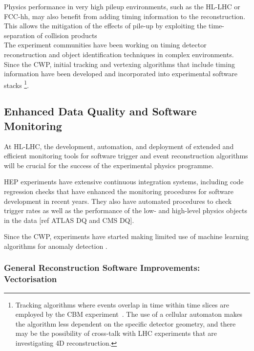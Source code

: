 Physics performance in very high pileup environments, such as the HL-LHC
or FCC-hh, may also benefit from adding timing information to the
reconstruction. This allows the mitigation of the effects of pile-up by
exploiting the time-separation of collision products~\cite{Collaboration:2623663,CMS:2667167}\\
The experiment communities have been working on timing detector
reconstruction and object identification techniques in complex
environments. Since the CWP, initial tracking and vertexing algorithms
that include timing information have been developed and incorporated
into experimental software stacks \cite{LindseyGreyMIPCTD}\footnote{Tracking algorithms where events overlap in time
within time slices are employed by the CBM experiment~\cite{Akishina:2015ghv,AkishinaThesis}. The use of a cellular automaton makes the
  algorithm less dependent on the specific detector geometry, and there
  may be the possibility of cross-talk with LHC experiments that are
  investigating 4D reconstruction.}.

\hypertarget{enhanced-data-quality-and-software-monitoring-for-trigger-and-reconstruction}{%
\subsection{Enhanced Data Quality and Software Monitoring}\label{enhanced-data-quality-and-software-monitoring-for-trigger-and-reconstruction}}

At HL-LHC, the development, automation, and deployment of extended and
efficient monitoring tools for software trigger and event reconstruction
algorithms will be crucial for the success of the experimental physics
programme.

HEP experiments have extensive continuous integration systems, including
code regression checks that have enhanced the monitoring procedures for
software development in recent years. They also have automated
procedures to check trigger rates as well as the performance of the low-
and high-level physics objects in the data {[}ref ATLAS DQ and CMS
DQ{]}.

Since the CWP, experiments have started making limited use of machine
learning algorithms for anomaly detection \cite{Adinolfi:2298467,CMSMonitoring}.

\hypertarget{general-reconstruction-software-improvements-vectorisation}{%
\subsubsection{General Reconstruction Software Improvements:
Vectorisation}\label{general-reconstruction-software-improvements-vectorization}}

